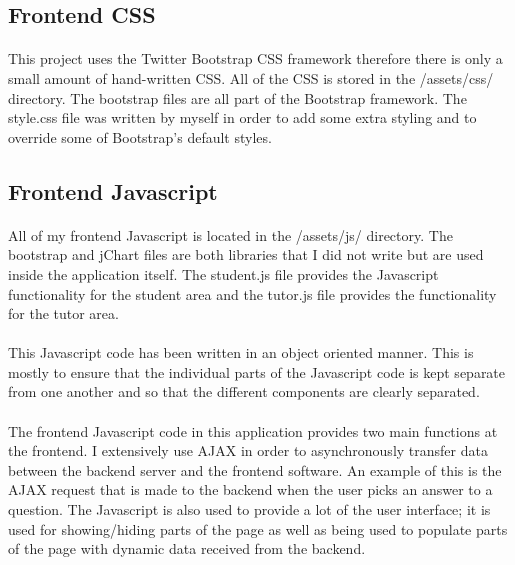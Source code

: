 \documentclass[10pt]{report}
\begin{document}
	\subsection*{Frontend CSS}
	\paragraph{}
	This project uses the Twitter Bootstrap CSS framework therefore there is only a small amount of
	hand-written CSS.  All of the CSS is stored in the /assets/css/ directory.  The bootstrap files are
	all part of the Bootstrap framework.  The style.css file was written by myself in order to add some
	extra styling and to override some of Bootstrap's default styles.
	
	\subsection*{Frontend Javascript}
	\paragraph{}
	All of my frontend Javascript is located in the /assets/js/ directory.  The bootstrap and jChart files
	are both libraries that I did not write but are used inside the application itself.   The student.js
	file provides the Javascript functionality for the student area and the tutor.js file provides the
	functionality for the tutor area.
	
	\paragraph{}
	This Javascript code has been written in an object oriented manner.  This is mostly to ensure that
	the individual parts of the Javascript code is kept separate from one another and so that the
	different components are clearly separated.
	
	\paragraph{}
	The frontend Javascript code in this application provides two main functions at the frontend.  I
	extensively	use AJAX in order to asynchronously transfer data between the backend server and the
	frontend software.  An example of this is the AJAX request that is made to the backend when the user
	picks an answer to a question.  The Javascript is also used to provide a lot of the user interface; it
	is used	for showing/hiding parts of the page as well as being used to populate parts of the page with
    dynamic data received from the backend.
    
\end{document}
